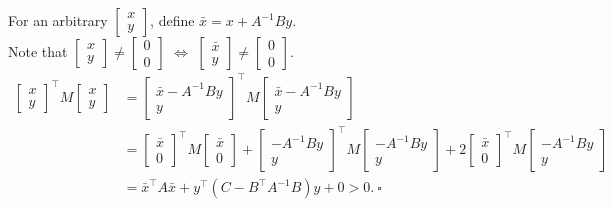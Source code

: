 \documentclass[letterpaper]{article}
\begin{document}
		For an arbitrary $\begin{bmatrix} x \\ y \end{bmatrix}$, define $\bar{x} = x+A^{-1} B y$.\\
        Note that
		$\begin{bmatrix} x \\ y \end{bmatrix} \neq \begin{bmatrix} 0 \\ 0 \end{bmatrix}$
		$\Leftrightarrow$
		$\begin{bmatrix} \bar{x} \\ y \end{bmatrix} \neq \begin{bmatrix} 0 \\ 0 \end{bmatrix}$.
        \begin{align*}
		\begin{bmatrix} x \\ y  \end{bmatrix} ^\top M \begin{bmatrix} x \\ y \end{bmatrix}
		  	& = \begin{bmatrix} \bar{x} -A^{-1}By \\ y  \end{bmatrix}^\top M
						\begin{bmatrix} \bar{x}-A^{-1}By \\ y   \end{bmatrix}  \\
		  	& =	\begin{bmatrix} \bar{x}  \\ 0 \end{bmatrix} ^\top M
		     		\begin{bmatrix} \bar{x} \\  0 \end{bmatrix} +
				 		\begin{bmatrix} -A^{-1} B y  \\ y	\end{bmatrix} ^\top M
						\begin{bmatrix} -A^{-1} B y \\  y	\end{bmatrix}
				 +  2 \begin{bmatrix} \bar{x} \\ 0 \end{bmatrix} ^\top M
						\begin{bmatrix} -A^{-1} B y \\  y	\end{bmatrix} \\
			  & = \bar{x}^\top A \bar{x} + y^\top (C-B^\top A^{-1} B) y + 0 > 0.\ \square
		\end{align*}
\end{document}
